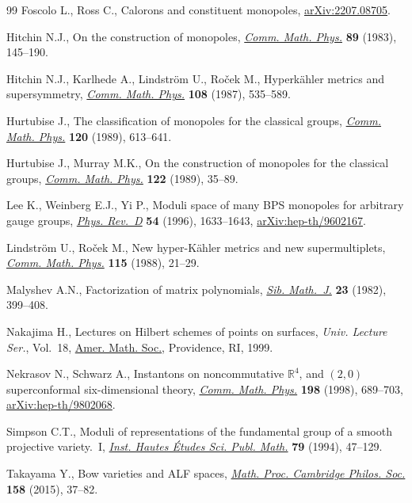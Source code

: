 \begin{thebibliography}{99}
Foscolo L., Ross C., Calorons and constituent monopoles, \href{https://arxiv.org/abs/2207.08705}{arXiv:2207.08705}.

Hitchin N.J., On the construction of monopoles, \href{http://dx.doi.org/10.1007/BF01211826}{\textit{Comm. Math. Phys.}}
 \textbf{89} (1983), 145--190.

Hitchin N.J., Karlhede A., Lindstr\"om U., Ro\v{c}ek M., Hyperk\"ahler metrics
 and supersymmetry, \href{https://doi.org/10.1007/BF01214418}{\textit{Comm. Math. Phys.}} \textbf{108} (1987), 535--589.

Hurtubise J., The classification of monopoles for the classical groups,
 \href{http://dx.doi.org/10.1007/BF01260389}{\textit{Comm. Math. Phys.}} \textbf{120} (1989), 613--641.

Hurtubise J., Murray M.K., On the construction of monopoles for the classical
 groups, \href{http://dx.doi.org/10.1007/BF01221407}{\textit{Comm. Math. Phys.}} \textbf{122} (1989), 35--89.

Lee K., Weinberg E.J., Yi P., Moduli space of many {BPS} monopoles for
 arbitrary gauge groups, \href{https://doi.org/10.1103/PhysRevD.54.1633}{\textit{Phys. Rev.~D}} \textbf{54} (1996), 1633--1643,
 \href{https://arxiv.org/abs/hep-th/9602167}{arXiv:hep-th/9602167}.

Lindstr\"om U., Ro\v{c}ek M., New hyper-{K}\"ahler metrics and new
 supermultiplets, \href{https://doi.org/10.1007/BF01238851}{\textit{Comm. Math. Phys.}} \textbf{115} (1988), 21--29.

Malyshev A.N., Factorization of matrix polynomials, \href{https://doi.org/10.1007/BF00973497}{\textit{Sib. Math.~J.}}
 \textbf{23} (1982), 399--408.

Nakajima H., Lectures on {H}ilbert schemes of points on surfaces, \textit{Univ.
 Lecture Ser.}, Vol.~18, \href{https://doi.org/10.1090/ulect/018}{Amer. Math. Soc.}, Providence, RI, 1999.

Nekrasov N., Schwarz A., Instantons on noncommutative {$\mathbb{R}^4$}, and
 {$(2,0)$} superconformal six-dimensional theory, \href{https://doi.org/10.1007/s002200050490}{\textit{Comm. Math. Phys.}}
 \textbf{198} (1998), 689--703, \href{https://arxiv.org/abs/hep-th/9802068}{arXiv:hep-th/9802068}.

Simpson C.T., Moduli of representations of the fundamental group of a smooth
 projective variety.~{I}, \href{https://doi.org/10.1007/BF02698887}{\textit{Inst. Hautes \'Etudes Sci. Publ. Math.}}
 \textbf{79} (1994), 47--129.

Takayama Y., Bow varieties and {ALF} spaces, \href{https://doi.org/10.1017/S0305004114000553}{\textit{Math. Proc. Cambridge
 Philos. Soc.}} \textbf{158} (2015), 37--82.

\end{thebibliography}\LastPageEnding
